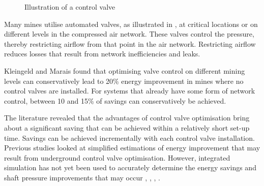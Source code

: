 		 \begin{figure}[!htbp]
		 	\centering
		 	\caption[Illustration of a control valve]{Illustration of a control valve \cite{Kriel2014Masters}}
		 	\label{fig: Control Valve Illustration}
		 \end{figure}
		 Many mines utilise automated valves, as illustrated in , at critical locations or on different levels in the compressed air network. These valves control the pressure, thereby restricting airflow from that point in the air network. Restricting airflow reduces losses that result from network inefficiencies and leaks.
		 \par 
		 Kleingeld and Marais \cite{kleingeld2010high} found that optimising valve control on different mining levels can conservatively lead to 20\% energy improvement in mines where no control valves are installed. For systems that already have some form of network control, between 10 and 15\% of savings can conservatively be achieved.
		 \par 
		 The literature revealed that the advantages of control valve optimisation bring about a significant saving that can be achieved within a relatively short set-up time. Savings can be achieved incrementally with each control valve installation. Previous studies looked at simplified estimations of energy improvement that may result from underground control valve optimisation. However, integrated simulation has not yet been used to accurately determine the energy savings and shaft pressure improvements that may occur \cite{schroeder2009energy}, \cite{kleingeld2010high}, \cite{marais2009increased}, \cite{Neser2008}.%
